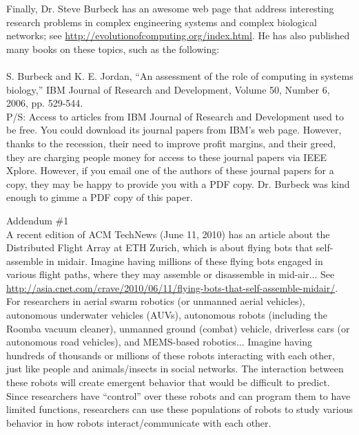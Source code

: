 Finally, Dr. Steve Burbeck has an awesome web page that address interesting research problems in complex engineering systems and complex biological networks; see \url{http://evolutionofcomputing.org/index.html}. He has also published many books on these topics, such as the following: \\
\ \\
S. Burbeck and K. E. Jordan, ``An assessment of the role of computing in systems biology,'' IBM Journal of Research and Development, Volume 50, Number 6, 2006, pp. 529-544. \\

P/S: Access to articles from IBM Journal of Research and Development used to be free. You could download its journal papers from IBM's web page. However, thanks to the recession, their need to improve profit margins, and their greed, they are charging people money for access to these journal papers via IEEE Xplore. However, if you email one of the authors of these journal papers for a copy, they may be happy to provide you with a PDF copy. Dr. Burbeck was kind enough to gimme a PDF copy of this paper. \\



\vspace{1cm}

Addendum \#1 \\

A recent edition of ACM TechNews (June 11, 2010) has an article about the Distributed Flight Array at ETH Zurich, which is about flying bots that self-assemble in midair. Imagine having millions of these flying bots engaged in various flight paths, where they may assemble or disassemble in mid-air... See \url{http://asia.cnet.com/crave/2010/06/11/flying-bots-that-self-assemble-midair/}. \\

For researchers in aerial swarm robotics (or unmanned aerial vehicles), autonomous underwater vehicles (AUVs), autonomous robots (including the Roomba vacuum cleaner), unmanned ground (combat) vehicle, driverless cars (or autonomous road vehicles), and MEMS-based robotics... Imagine having hundreds of thousands or millions of these robots interacting with each other, just like people and animals/insects in social networks. The interaction between these robots will create emergent behavior that would be difficult to predict. Since researchers have ``control'' over these robots and can program them to have limited functions, researchers can use these populations of robots to study various behavior in how robots interact/communicate with each other. \\

